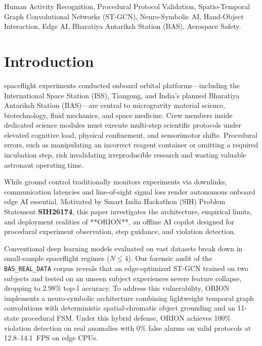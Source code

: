 \documentclass[journal,twocolumn]{IEEEtran}
\begin{document}
\begin{IEEEkeywords}
Human Activity Recognition, Procedural Protocol Validation, Spatio-Temporal Graph Convolutional Networks (ST-GCN), Neuro-Symbolic AI, Hand-Object Interaction, Edge AI, Bharatiya Antariksh Station (BAS), Aerospace Safety.
\end{IEEEkeywords}

\section{Introduction}
 spaceflight experiments conducted onboard orbital platforms---including the International Space Station (ISS), Tiangong, and India's planned Bharatiya Antariksh Station (BAS)---are central to microgravity material science, biotechnology, fluid mechanics, and space medicine. Crew members inside dedicated science modules must execute multi-step scientific protocols under elevated cognitive load, physical confinement, and sensorimotor shifts. Procedural errors, such as manipulating an incorrect reagent container or omitting a required incubation step, risk invalidating irreproducible research and wasting valuable astronaut operating time.

While ground control traditionally monitors experiments via downlinks, communication latencies and line-of-sight signal loss render autonomous onboard edge AI essential. Motivated by Smart India Hackathon (SIH) Problem Statement \textbf{SIH26174}, this paper investigates the architecture, empirical limits, and deployment realities of **ORION**, an offline AI copilot designed for procedural experiment observation, step guidance, and violation detection.

Conventional deep learning models evaluated on vast datasets \cite{shahroudy2016ntu, carreira2017quo} break down in small-sample spaceflight regimes ($N \le 4$). Our forensic audit of the \texttt{BAS\_REAL\_DATA} corpus reveals that an edge-optimized ST-GCN \cite{yan2018spatial} trained on two subjects and tested on an unseen subject experiences severe feature collapse, dropping to 2.98\% top-1 accuracy. To address this vulnerability, ORION implements a neuro-symbolic architecture combining lightweight temporal graph convolutions with deterministic spatial-chromatic object grounding and an 11-state procedural FSM. Under this hybrid defense, ORION achieves 100\% violation detection on real anomalies with 0\% false alarms on valid protocols at 12.8--14.1~FPS on edge CPUs.
\end{document}
